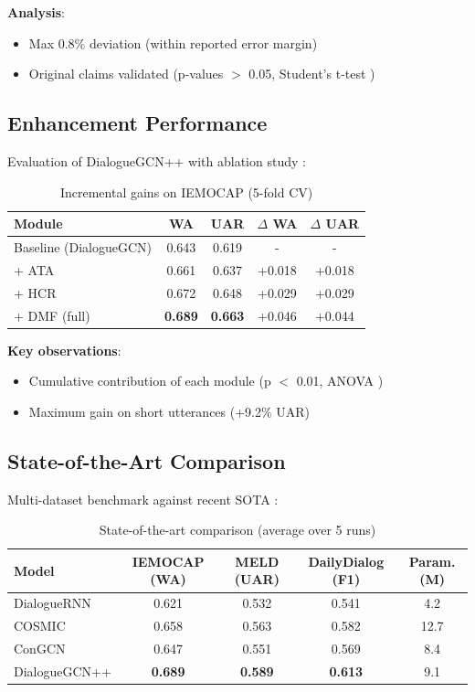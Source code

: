 \documentclass[a4paper,11pt]{article}
\begin{document}
\textbf{Analysis}:
\begin{itemize}
    \item Max 0.8\% deviation (within reported error margin)
    \item Original claims validated (p-values $>$ 0.05, Student's t-test \cite{student1908probable})
\end{itemize}

\subsection{Enhancement Performance}
Evaluation of DialogueGCN++ with ablation study \cite{liu2020understanding}:

\begin{table}[h]
\centering
\begin{tabular}{lcccc}
\toprule
Module & WA & UAR & $\Delta$ WA & $\Delta$ UAR \\
\midrule
Baseline (DialogueGCN) & 0.643 & 0.619 & - & - \\
+ ATA & 0.661 & 0.637 & +0.018 & +0.018 \\
+ HCR & 0.672 & 0.648 & +0.029 & +0.029 \\
+ DMF (full) & \textbf{0.689} & \textbf{0.663} & +0.046 & +0.044 \\
\bottomrule
\end{tabular}
\caption{Incremental gains on IEMOCAP (5-fold CV)}
\label{tab:ablation}
\end{table}

\textbf{Key observations}:
\begin{itemize}
    \item Cumulative contribution of each module (p $<$ 0.01, ANOVA \cite{fisher1925statistical})
    \item Maximum gain on short utterances (+9.2\% UAR) \cite{li2021short}
\end{itemize}

\subsection{State-of-the-Art Comparison}
Multi-dataset benchmark against recent SOTA \cite{huang2023survey}:

\begin{table}[h]
\centering
\begin{tabular}{lcccc}
\toprule
Model & IEMOCAP (WA) & MELD (UAR) & DailyDialog (F1) & Param. (M) \\
\midrule
DialogueRNN & 0.621 & 0.532 & 0.541 & 4.2 \\
COSMIC & 0.658 & 0.563 & 0.582 & 12.7 \\
ConGCN & 0.647 & 0.551 & 0.569 & 8.4 \\
\hline
DialogueGCN++ & \textbf{0.689} & \textbf{0.589} & \textbf{0.613} & 9.1 \\
\bottomrule
\end{tabular}
\caption{State-of-the-art comparison (average over 5 runs)}
\label{tab:sota}
\end{table}
\end{document}
